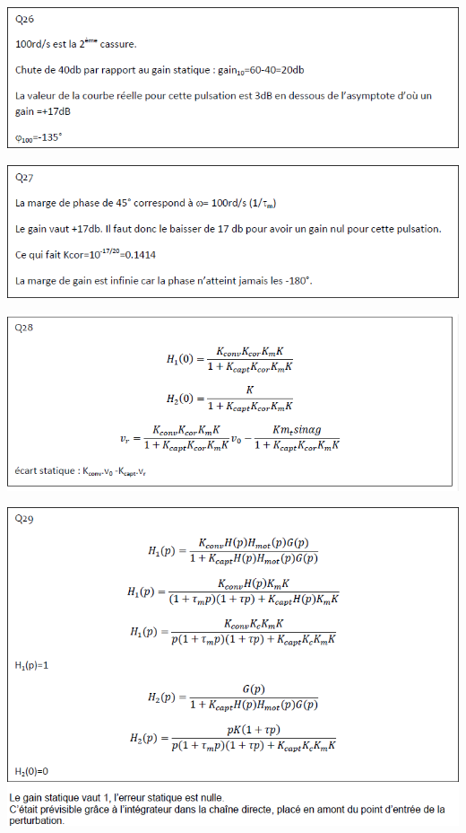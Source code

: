 \documentclass[10pt,fleqn]{article} %
\begin{document}
\begin{center}
	\includegraphics[width=.8\linewidth]{images/cor_05}
\end{center}

\begin{center}
	\includegraphics[width=.8\linewidth]{images/cor_06}
\end{center}

\begin{center}
	\includegraphics[width=.8\linewidth]{images/cor_07}
\end{center}

\begin{center}
	\includegraphics[width=.8\linewidth]{images/cor_08}
\end{center}
\end{document}

